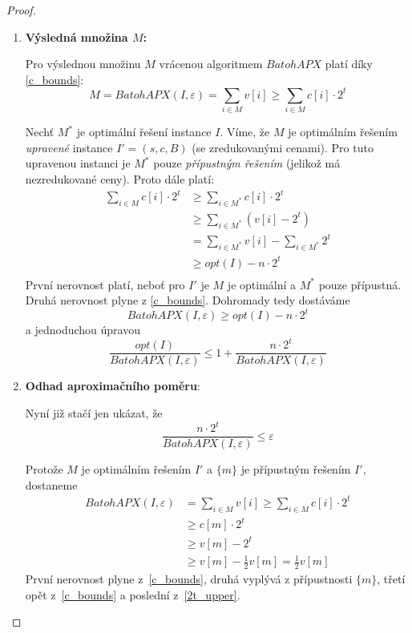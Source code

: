 \documentclass[11pt]{report} %
\numberwithin{equation}{section}
\begin{document}
\begin{proof}
\begin{enumerate}
\begin{enumerate}
\begin{enumerate}
		\item \textbf{Výsledná množina $M$:}
		
		Pro výslednou množinu $M$ vrácenou algoritmem $BatohAPX$ platí díky \ref{c_bounds}:
		\begin{equation*}
			M = BatohAPX(I, \varepsilon) = \sum\limits_{i\in M} v[i] \geq \sum\limits_{i\in M} c[i] \cdot 2^t
		\end{equation*}
		
		Nechť $M^*$ je optimální řešení instance $I$. Víme, že $M$ je optimálním řešením \textit{upravené} instance $I' = (s, c, B)$ (se zredukovanými cenami). Pro tuto upravenou instanci je $M^*$ pouze \textit{přípustným řešením} (jelikož má nezredukované ceny). Proto dále platí:
		\begin{align*}
			\sum\limits_{i\in M} c[i] \cdot 2^t &\geq \sum\limits_{i\in M^*} c[i] \cdot 2^t \\
												&\geq \sum\limits_{i\in M^*} (v[i] - 2^t) \\
												&= \sum\limits_{i\in M^*} v[i] - \sum\limits_{i\in M^*} 2^t \\
												&\geq opt(I) - n\cdot 2^t\\
		\end{align*}
		První nerovnost platí, neboť pro $I'$ je $M$ je optimální a $M^*$ pouze přípustná. Druhá nerovnost plyne z \ref{c_bounds}. 
		\medskip
		Dohromady tedy dostáváme
		\begin{equation*}
			BatohAPX(I, \varepsilon) \geq opt(I) - n\cdot 2^t
		\end{equation*}
		a jednoduchou úpravou
		\begin{equation*}
		\frac{opt(I)}{BatohAPX(I, \varepsilon)} \leq 1 + \frac{n\cdot 2^t}{BatohAPX(I, \varepsilon)}
		\end{equation*}
		
		\item \textbf{Odhad aproximačního poměru}:
		
		Nyní již stačí jen ukázat, že
		\begin{equation*}
			\frac{n\cdot 2^t}{BatohAPX(I, \varepsilon)} \leq \varepsilon
		\end{equation*}
		
		Protože $M$ je optimálním řešením $I'$ a $\{m\}$ je přípustným řešením $I'$, dostaneme
		\begin{align*}
			BatohAPX(I, \varepsilon) 	&= \sum\limits_{i \in M} v[i] \geq \sum\limits_{i \in M} c[i]\cdot 2^t \\
                    &\geq c[m] \cdot 2^t\\
										&\geq v[m] - 2^t\\
										&\geq v[m] - \frac{1}{2}v[m] = \frac{1}{2}v[m]
		\end{align*}
		První nerovnost plyne z~\ref{c_bounds}, druhá vyplývá z přípustnosti $\{m\}$, třetí opět z~\ref{c_bounds} a poslední z~\ref{2t_upper}.
		

\end{enumerate}
\end{enumerate}
\end{enumerate}
\end{proof}
\end{document}
